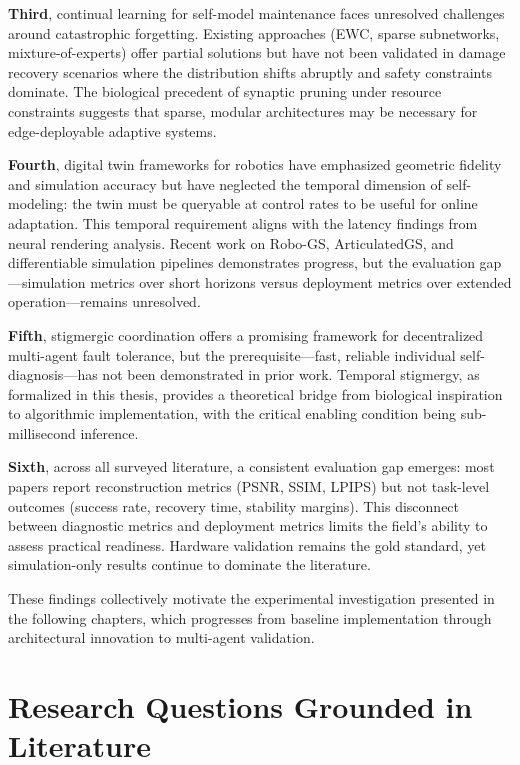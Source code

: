 ﻿\documentclass[12pt,a4paper,oneside]{report}
\begin{document}
\textbf{Third}, continual learning for self-model maintenance faces unresolved challenges around catastrophic forgetting. Existing approaches (EWC, sparse subnetworks, mixture-of-experts) offer partial solutions but have not been validated in damage recovery scenarios where the distribution shifts abruptly and safety constraints dominate. The biological precedent of synaptic pruning under resource constraints suggests that sparse, modular architectures may be necessary for edge-deployable adaptive systems.

\textbf{Fourth}, digital twin frameworks for robotics have emphasized geometric fidelity and simulation accuracy but have neglected the temporal dimension of self-modeling: the twin must be queryable at control rates to be useful for online adaptation. This temporal requirement aligns with the latency findings from neural rendering analysis. Recent work on Robo-GS, ArticulatedGS, and differentiable simulation pipelines demonstrates progress, but the evaluation gap---simulation metrics over short horizons versus deployment metrics over extended operation---remains unresolved.

\textbf{Fifth}, stigmergic coordination offers a promising framework for decentralized multi-agent fault tolerance, but the prerequisite---fast, reliable individual self-diagnosis---has not been demonstrated in prior work. Temporal stigmergy, as formalized in this thesis, provides a theoretical bridge from biological inspiration to algorithmic implementation, with the critical enabling condition being sub-millisecond inference.

\textbf{Sixth}, across all surveyed literature, a consistent evaluation gap emerges: most papers report reconstruction metrics (PSNR, SSIM, LPIPS) but not task-level outcomes (success rate, recovery time, stability margins). This disconnect between diagnostic metrics and deployment metrics limits the field's ability to assess practical readiness. Hardware validation remains the gold standard, yet simulation-only results continue to dominate the literature.

These findings collectively motivate the experimental investigation presented in the following chapters, which progresses from baseline implementation through architectural innovation to multi-agent validation.

\section{Research Questions Grounded in Literature}
\end{document}
